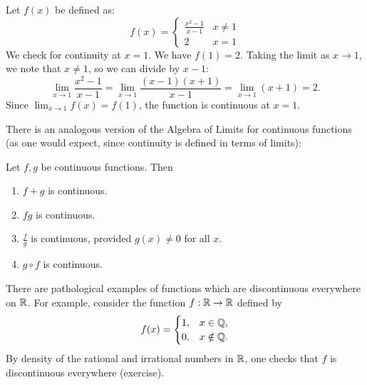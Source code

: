 \documentclass[../calculus.tex]{subfiles}
\begin{document}
\begin{example}
    Let $f(x)$ be defined as:
    $$f(x) = \begin{cases} 
    \frac{x^2-1}{x-1} & x \neq 1 \\
    2 & x = 1 
    \end{cases}$$
    We check for continuity at $x=1$. We have $f(1) = 2$. Taking the limit as $x \to 1$, we note that $x \neq 1$, so we can divide by $x-1$:
    \[\lim_{x\to 1} \frac{x^2-1}{x-1} = \lim_{x\to 1} \frac{(x-1)(x+1)}{x-1} = \lim_{x\to 1} (x+1) = 2.\]
    Since $\lim_{x\to 1} f(x) = f(1)$, the function is continuous at $x=1$.
\end{example}
There is an analogous version of the Algebra of Limits for continuous functions (as one would expect, since continuity is defined in terms of limits):
\begin{theorem}
    \begin{shaded*}
        Let $f,g$ be continuous functions. Then
        \begin{enumerate}
            \item[1.] $f+g$ is continuous.
            \item[2.] $fg$ is continuous.
            \item[3.] $\frac{f}{g}$ is continuous, provided $g(x)\ne 0$ for all $x$.
            \item[4.] $g\circ f$ is continuous.   
        \end{enumerate}
    \end{shaded*}
\end{theorem}
There are pathological examples of functions which are discontinuous everywhere on $\mathbb{R}$. For example, consider the function $f:\mathbb{R}\to\mathbb{R}$ defined by
\[f(x)=\begin{cases}
    1,& x\in\mathbb{Q},\\
    0,& x\notin\mathbb{Q}.
\end{cases}\]
By density of the rational and irrational numbers in $\mathbb{R}$, one checks that $f$ is discontinuous everywhere (exercise).
\end{document}
